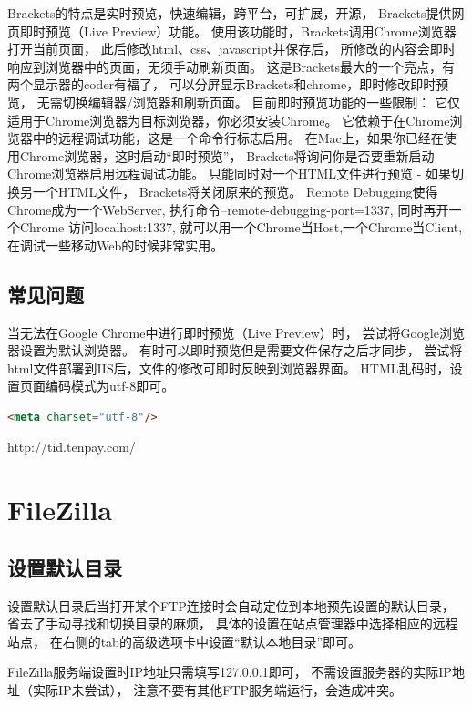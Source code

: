 \documentclass{book}
\begin{document}
Brackets的特点是实时预览，快速编辑，跨平台，可扩展，开源，
Brackets提供网页即时预览（Live Preview）功能。
使用该功能时，Brackets调用Chrome浏览器打开当前页面，
此后修改html、css、javascript并保存后，
所修改的内容会即时响应到浏览器中的页面，无须手动刷新页面。
这是Brackets最大的一个亮点，有两个显示器的coder有福了，
可以分屏显示Brackets和chrome，即时修改即时预览，
无需切换编辑器/浏览器和刷新页面。
目前即时预览功能的一些限制：
它仅适用于Chrome浏览器为目标浏览器，你必须安装Chrome。
它依赖于在Chrome浏览器中的远程调试功能，这是一个命令行标志启用。
在Mac上，如果你已经在使用Chrome浏览器，这时启动“即时预览”，
Brackets将询问你是否要重新启动Chrome浏览器启用远程调试功能。
只能同时对一个HTML文件进行预览 - 如果切换另一个HTML文件，
Brackets将关闭原来的预览。
Remote Debugging使得Chrome成为一个WebServer,
执行命令--remote-debugging-port=1337, 
同时再开一个Chrome 访问localhost:1337, 
就可以用一个Chrome当Host,一个Chrome当Client,
在调试一些移动Web的时候非常实用。

\subsection{常见问题}

当无法在Google Chrome中进行即时预览（Live Preview）时，
尝试将Google浏览器设置为默认浏览器。
有时可以即时预览但是需要文件保存之后才同步，
尝试将html文件部署到IIS后，文件的修改可即时反映到浏览器界面。
HTML乱码时，设置页面编码模式为utf-8即可。

\begin{lstlisting}[language=HTML]
<meta charset="utf-8"/>
\end{lstlisting}

http://tid.tenpay.com/

\section{FileZilla}

\subsection{设置默认目录}

设置默认目录后当打开某个FTP连接时会自动定位到本地预先设置的默认目录，
省去了手动寻找和切换目录的麻烦，
具体的设置在站点管理器中选择相应的远程站点，
在右侧的tab的高级选项卡中设置“默认本地目录”即可。

FileZilla服务端设置时IP地址只需填写127.0.0.1即可，
不需设置服务器的实际IP地址（实际IP未尝试），
注意不要有其他FTP服务端运行，会造成冲突。
\end{document}
